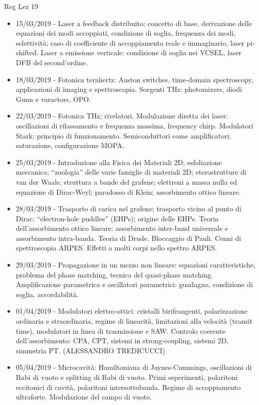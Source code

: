 \begin{frame}[allowframebreaks]{Reg Lez 19}
\begin{itemize}
    \item 15/03/2019 - Laser a feedback distribuito: concetto di base, derivazione delle equazioni dei modi accoppiati, condizione di soglia, frequenza dei modi, selettività; caso di coefficiente di accoppiamento reale e immaginario, laser pi-shifted. Laser a emissione verticale: condizione di soglia nei VCSEL, laser DFB del second'ordine.
    \item 18/03/2019 - Fotonica terahertz: Auston switches, time-domain spectroscopy, applicazioni di imaging e spettroscopia. Sorgenti THz: photomixers, diodi Gunn e varactors, OPO.
    \item 22/03/2019 - Fotonica THz; rivelatori. Modulazione diretta dei laser: oscillazioni di rilassamento e frequenza massima, frequency chirp. Modulatori Stark: principio di funzionamento. Semiconduttori come amplificatori: saturazione, configurazione MOPA.
    \item 25/03/2019 - Introduzione alla Fisica dei Materiali 2D; esfoliazione meccanica; “zoologia” delle varie famiglie di materiali 2D; eterostrutture di van der Waals; struttura a bande del grafene; elettroni a massa nulla ed equazione di Dirac-Weyl; paradosso di Klein; assorbimento ottico lineare.
    \item 28/03/2019 - Trasporto di carica nel grafene; trasporto vicino al punto di Dirac; “electron-hole puddles” (EHPs); origine delle EHPs. Teoria dell'assorbimento ottico lineare: assorbimento inter-band universale e assorbimento intra-banda. Teoria di Drude. Bloccaggio di Pauli. Cenni di spettroscopia ARPES. Effetti a molti corpi nello spettro ARPES.
    \item 29/03/2019 - Propagazione in un mezzo non lineare: equazioni caratteristiche, problema del phase matching, tecnica del quasi-phase matching. Amplificazione parametrica e oscillatori parametrici: guadagno, condizione di soglia, accordabilità.
    \item 01/04/2019 - Modulatori elettro-ottici: cristalli birifrangenti, polarizzazione ordinaria e straordinaria, regime di linearità, limitazioni alla velocità (transit time), modulatori in linea di trasmissione e SAW. Controlo coerente dell'assorbimento: CPA, CPT, sistemi in strong-coupling, sistemi 2D, simmetria PT. (ALESSANDRO TREDICUCCI)
    \item 05/04/2019 - Microcavità: Hamiltoniana di Jaynes-Cummings, oscillazioni di Rabi di vuoto e splitting di Rabi di vuoto. Primi esperimenti, polaritoni eccitonici di cavità, polaritoni intersottobanda. Regime di accoppiamento ultraforte. Modulazione del campo di vuoto.

\end{itemize}
\end{frame}
